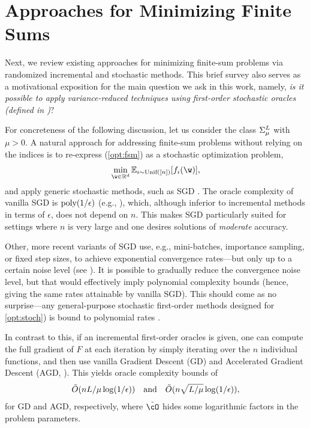 \documentclass{article}
\theoremstyle{definition}  \newtheorem{exercise}{Exercise}
\theoremstyle{plain}
\newcommand{\pref}[1]{\prettyref{#1}}
\newcommand{\EE}{\mathbb{E}}
\newcommand{\RR}{\mathbb{R}}
\DeclarePairedDelimiter{\prn}{(}{)}
\newcommand{\strcvx}{\mu} \newcommand{\query}{B}
\theoremstyle{definition}
\theoremstyle{remark}
\begin{document}
 \section{Approaches for Minimizing Finite Sums} \label{sec:related}


	Next, we review existing approaches for minimizing finite-sum 
	problems via randomized incremental and stochastic methods. This 
	brief 
	survey also serves as a motivational exposition for the main question 
	we 
	ask in this work, namely, \emph{is it possible to apply variance-reduced 
	techniques using first-order stochastic oracles (defined in 
	\pref{eq:stoch_orc})}?
	
	For concreteness of the following discussion, let us consider the 
	class 
	$\fsmlL$ with $\strcvx>0$. A natural approach for addressing 
	finite-sum problems without relying on the indices is to re-express 
	(\ref{opt:fsm}) as a stochastic optimization problem,
	\begin{align} \label{opt:stoch}
		\min_{\w\in\RR^d} \EE_{i\sim\text{Unif}([n])}[f_i(\w)], 
	\end{align}
	and apply generic stochastic methods, such as SGD 
	\cite{robbins1951stochastic}. The oracle complexity of vanilla SGD is 
	$\text{poly}\prn{1/\epsilon}$ (e.g., \cite{nemirovski2009robust}), which, 
	although inferior to incremental methods in terms of $\epsilon$, does not 
	depend on $n$. This makes SGD particularly suited for settings where $n$ is 
	very large and one desires solutions of \emph{moderate} 
	accuracy.


	
	
	
	Other, more recent variants of SGD use, e.g., mini-batches, importance 
	sampling, or fixed step sizes, to achieve exponential convergence 	
	rates---but only up to a certain noise level (see
	\cite{moulines2011non,needell2014stochastic,needell2016batched,gower2019sgd}).
	It is possible to gradually reduce the convergence noise level, but 
	that would effectively imply polynomial complexity bounds (hence, 
	giving the same rates attainable by vanilla SGD). This should come 
	as no surprise---any general-purpose stochastic first-order methods 
	designed for \ref{opt:stoch}) is bound to polynomial rates	
	\cite{nemirovskyproblem,agarwal2009information,raginsky2011information}.


	In contrast to this, if an incremental first-order oracles is given, one 
	can compute the full gradient of $F$ at each iteration by simply 
	iterating over the $n$ individual functions, and then use vanilla 
	Gradient Descent (GD) and Accelerated Gradient Descent (AGD, 
	\cite{nesterov2004introductory}). This yields oracle complexity bounds 
	of
	\begin{align} \label{opt:gd_agd} 
		\tilde{O}\prn{nL/ \strcvx\log(1/\epsilon)} ~~\text{ and }~~
		\tilde{O}\prn{n\sqrt{L/\strcvx}\log(1/\epsilon)}, 
	\end{align} 
	for GD and AGD, respectively, where $\tilde{\cO}$ hides some logarithmic 
	factors in the problem parameters.  
	
\end{document}
